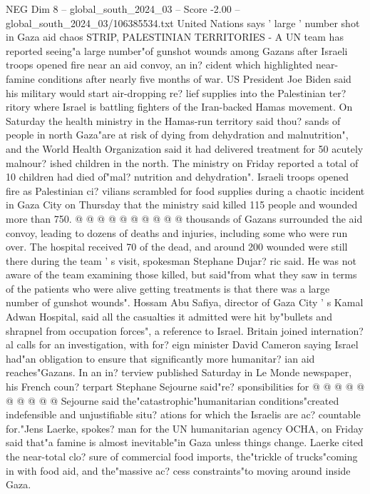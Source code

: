 \begin{textsample}{NEG Dim 8 – global\_south\_2024\_03 – Score -2.00 – global\_south\_2024\_03/106385534.txt}  \label{ex:f8_neg_024}
United Nations says ' large ' number shot in Gaza aid chaos STRIP, PALESTINIAN TERRITORIES - A UN team has reported seeing"a large number"of gunshot wounds among Gazans after Israeli troops opened fire near an aid convoy, an in? cident which highlighted near-famine conditions after nearly five months of war.
US President Joe Biden said his military would start air-dropping re? lief supplies into the Palestinian ter? ritory where Israel is battling fighters of the Iran-backed Hamas movement.
On Saturday the health ministry in the Hamas-run territory said thou? sands of people in north Gaza"are at risk of dying from dehydration and malnutrition", and the World Health Organization said it had delivered treatment for 50 acutely malnour? ished children in the north.
The ministry on Friday reported a total of 10 children had died of"mal? nutrition and dehydration".
Israeli troops opened fire as Palestinian ci? vilians scrambled for food supplies during a chaotic incident in Gaza City on Thursday that the ministry said killed 115 people and wounded more than 750. @ @ @ @ @ @ @ @ @ @ thousands of Gazans surrounded the aid convoy, leading to dozens of deaths and injuries, including some who were run over.
The hospital received 70 of the dead, and around 200 wounded were still there during the team ' s visit, spokesman Stephane Dujar? ric said.
He was not aware of the team examining those killed, but said"from what they saw in terms of the patients who were alive getting treatments is that there was a large number of gunshot wounds".
Hossam Abu Safiya, director of Gaza City ' s Kamal Adwan Hospital, said all the casualties it admitted were hit by"bullets and shrapnel from occupation forces", a reference to Israel.
Britain joined internation? al calls for an investigation, with for? eign minister David Cameron saying Israel had"an obligation to ensure that significantly more humanitar? ian aid reaches"Gazans.
In an in? terview published Saturday in Le Monde newspaper, his French coun? terpart Stephane Sejourne said"re? sponsibilities for @ @ @ @ @ @ @ @ @ @ Sejourne said the"catastrophic"humanitarian conditions"created indefensible and unjustifiable situ? ations for which the Israelis are ac? countable for."Jens Laerke, spokes? man for the UN humanitarian agency OCHA, on Friday said that"a famine is almost inevitable"in Gaza unless things change.
Laerke cited the near-total clo? sure of commercial food imports, the"trickle of trucks"coming in with food aid, and the"massive ac? cess constraints"to moving around inside Gaza.

\end{textsample}
